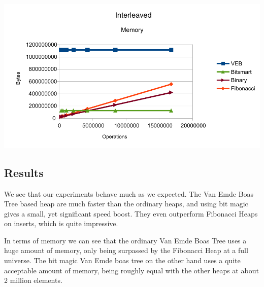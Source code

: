 \includegraphics[width=\textwidth]{graphs/Interleaved_memory.pdf}



\subsection{Results}

We see that our experiments behave much as we expected. The Van Emde Boas Tree  based heap are much faster than the ordinary heaps, and using bit magic gives a small, yet significant speed boost. They even outperform Fibonacci Heaps on inserts, which is quite impressive.

In terms of memory we can see that the ordinary Van Emde Boas Tree uses a huge amount of memory, only being surpassed by the Fibonacci Heap at a full universe. The bit magic Van Emde boas tree on the other hand uses a quite acceptable amount of memory, being roughly equal with the other heaps at about 2 million elements.